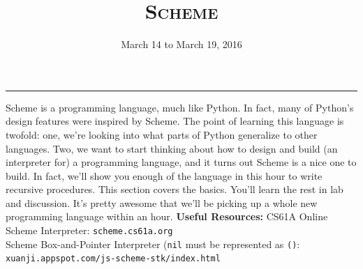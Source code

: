 \documentclass{exam}
\title{\textsc{Scheme}}
\date{March 14 to March 19, 2016}
\begin{document}
\maketitle
\rule{\textwidth}{0.15em}
\fontsize{12}{15}\selectfont




\begin{blocksection}
Scheme is a programming language, much like Python. In fact, many of Python's design features were inspired by Scheme. The point of learning this language is twofold: one, we're looking into what parts of Python generalize to other languages. Two, we want to start thinking about how to design and build (an interpreter  for) a programming language, and it turns out Scheme is a nice one to build. In fact, we'll show you enough of the language in this hour to write recursive procedures. This section covers the basics. You'll learn the rest in lab and discussion. It's pretty awesome that we'll be picking up a whole new programming language within an hour.
\newline
\newline
\textbf{Useful Resources:} \newline
CS61A Online Scheme Interpreter: \texttt{scheme.cs61a.org}\\
Scheme Box-and-Pointer Interpreter (\texttt{nil} must be represented as
\texttt{()}: \texttt{xuanji.appspot.com/js-scheme-stk/index.html}
\end{blocksection}
\end{document}
